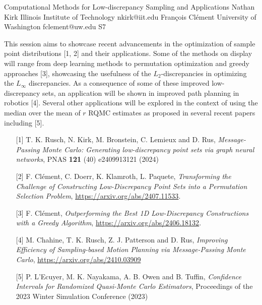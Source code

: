 

\clearpage

\begin{session}
 {Computational Methods for Low-discrepancy Sampling and Applications}%
 {Nathan Kirk}%
 {Illinois Institute of Technology}%
 {nkirk@iit.edu}%
 {François Clément}%
 {University of Washington}%
 {fclement@uw.edu}%
 {S7}%
{}

 This session aims to showcase recent advancements in the optimization of sample point distributions [1, 2] and their applications. Some of the methods on display will range from deep learning methods to permutation optimization and greedy approaches [3], showcasing the usefulness of the $L_2$-discrepancies in optimizing the $L_{\infty}$ discrepancies. As a consequence of some of these improved low-discrepancy sets, an application will be shown in improved path planning in robotics [4]. Several other applications will be explored in the context of using the median over the mean of $r$ RQMC estimates as proposed in several recent papers including [5].
 \medskip
 \begin{enumerate}
 \item[{[1]}] T. K. Rusch, N. Kirk, M. Bronstein, C. Lemieux and D. Rus, \textit{Message-Passing Monte Carlo: Generating low-discrepancy point sets via graph neural networks}, PNAS \textbf{121} (40) e2409913121 (2024)
 \item[{[2]}] F. Clément, C. Doerr, K. Klamroth, L. Paquete, \textit{Transforming the Challenge of Constructing Low-Discrepancy Point Sets into a Permutation Selection Problem}, \url{https://arxiv.org/abs/2407.11533}.
 \item[{[3]}] F. Cl\'ement, \textit{Outperforming the Best {1D} Low-Discrepancy Constructions with a Greedy Algorithm}, \url{https://arxiv.org/abs/2406.18132}.
 \item[{[4]}] M. Chahine, T. K. Rusch, Z. J. Patterson and D. Rus, \textit{Improving Efficiency of Sampling-based Motion Planning via Message-Passing Monte Carlo}, \url{https://arxiv.org/abs/2410.03909}
 \item[{[5]}] P. L'Ecuyer, M. K. Nayakama, A. B. Owen and B. Tuffin, \textit{Confidence Intervals for Randomized Quasi-Monte Carlo Estimators}, Proceedings of the 2023 Winter Simulation Conference (2023)
 \end{enumerate}
\end{session}

